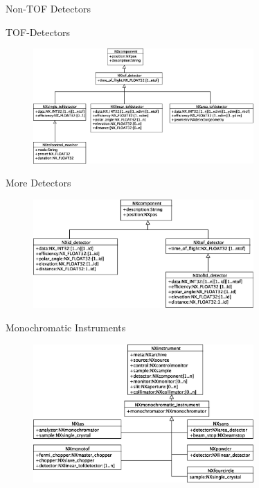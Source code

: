\documentclass[final,nototal,pdf,mark]{prosper}
\begin{document}
\begin{slide}{Non-TOF Detectors }
\begin{center}
\end{center}

\end{slide}\begin{slide}{TOF-Detectors }
\begin{center}
\begin{figure}
\includegraphics[width=0.75\textwidth]{nxtofdet.eps}\end{figure}



\end{center}

\end{slide}\begin{slide}{More Detectors }
\begin{center}
\begin{figure}
\includegraphics[width=0.75\textwidth]{nxmoredet.eps}\end{figure}



\end{center}

\end{slide}\begin{slide}{Monochromatic Instruments }
\begin{center}
\begin{figure}
\includegraphics[width=0.75\textwidth]{nxmonoinst.eps}\end{figure}




\end{center}
\end{slide}
\end{document}
